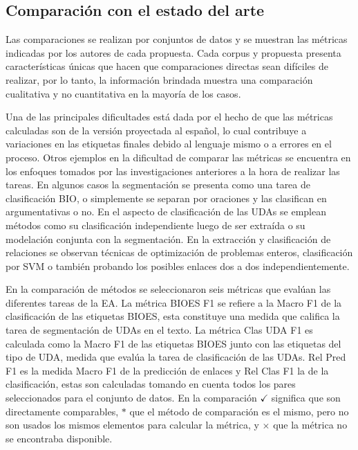 \subsection{Comparación con el estado del arte}

Las comparaciones se realizan por conjuntos de datos y se muestran las 
métricas indicadas por los autores de cada propuesta. Cada corpus y propuesta 
presenta características únicas que hacen que comparaciones directas sean 
difíciles de realizar, por lo tanto, la información brindada muestra una comparación 
cualitativa y no cuantitativa en la mayoría de los casos. 

Una de las principales dificultades está dada por el hecho de que las métricas calculadas son de la versión proyectada
al español, lo cual contribuye a variaciones en las etiquetas finales debido al lenguaje mismo 
o a errores en el proceso. Otros ejemplos en la dificultad de comparar las métricas se encuentra
en los enfoques tomados por las investigaciones anteriores a la hora de realizar las tareas.
En algunos casos la segmentación se presenta como una tarea de clasificación BIO, o simplemente 
se separan por oraciones y las clasifican en argumentativas o no. En el aspecto de clasificación
de las UDAs se emplean métodos como su clasificación independiente luego de ser extraída o su modelación
conjunta con la segmentación. En la extracción y clasificación de relaciones se observan técnicas de 
optimización de problemas enteros, clasificación por SVM o también probando los posibles enlaces dos 
a dos independientemente.

En la comparación de métodos se seleccionaron seis métricas que evalúan las diferentes 
tareas de la EA. La métrica BIOES F1 se refiere 
a la Macro F1 de la clasificación de las etiquetas BIOES, esta constituye una medida
que califica la tarea de segmentación de UDAs en el texto. La métrica Clas UDA F1 es 
calculada como la Macro F1 de las etiquetas BIOES junto con las etiquetas del tipo de 
UDA, medida que evalúa la tarea de clasificación de las UDAs. Rel Pred F1 es la medida 
Macro F1 de la predicción de enlaces y Rel Clas F1 la de la clasificación, estas 
son calculadas tomando en cuenta todos los pares seleccionados para el conjunto de 
datos. En la comparación $\checkmark$ significa que son directamente comparables,
$*$ que el método de comparación es el mismo, pero no son usados los mismos 
elementos para calcular la métrica, y $\times$ que la métrica no se encontraba disponible.

